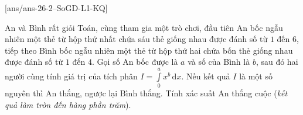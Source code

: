 \caukq
{}[ans/ans-26-2--SoGD-L1-KQ]
\begin{ex}%
	An và Bình rất giỏi Toán, cùng tham gia một trò chơi, đầu tiên An bốc ngẫu nhiên một thẻ từ hộp thứ nhất chứa sáu thẻ giống nhau được đánh số từ $1$ đến $6$, tiếp theo Bình bốc ngẫu nhiên một thẻ từ hộp thứ hai chứa bốn thẻ giống nhau được đánh số từ $1$ đến $4$. Gọi số An bốc được là $a$ và số của Bình là $b$, sau đó hai người cùng tính giá trị của tích phân $I=\displaystyle\int\limits_0^a x^b \mathrm{\,d}x$. Nếu kết quả $I$ là một số nguyên thì An thắng, ngược lại Bình thắng. Tính xác suất An thắng cuộc (\textit{kết quả làm tròn đến hàng phần trăm}).
\end{ex}

